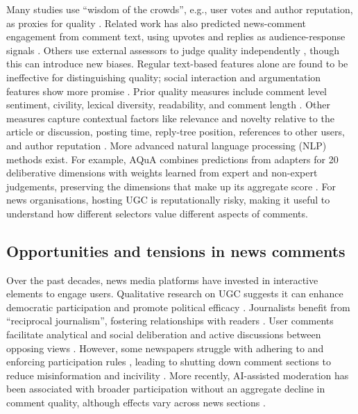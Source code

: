 Many studies use ``wisdom of the crowds'', e.g., user votes and author reputation, as proxies for quality \citep{Momeni2016, Wei2016, Tan2016}. Related work has also predicted news-comment engagement from comment text, using upvotes and replies as audience-response signals \citep{RischKrestel2020}. Others use external assessors to judge quality independently \citep{Momeni2016}, though this can introduce new biases. Regular text-based features alone are found to be ineffective for distinguishing quality; social interaction and argumentation features show more promise \citep{Momeni2016}. Prior quality measures include comment level sentiment, civility, lexical diversity, readability, and comment length \citep{Diakopoulos2015,Otterbacher2009,Park2016,Wang2021}. Other measures capture contextual factors like relevance and novelty relative to the article or discussion, posting time, reply-tree position, references to other users, and author reputation \citep{Otterbacher2009,Schuth2007,Momeni2016}.
More advanced natural language processing (NLP) methods exist. For example, AQuA combines predictions from adapters for 20 deliberative dimensions with weights learned from expert and non-expert judgements, preserving the dimensions that make up its aggregate score \citep{Behrendt2024}. For news organisations, hosting UGC is reputationally risky, making it useful to understand how different selectors value different aspects of comments.

\subsection{Opportunities and tensions in news comments}
Over the past decades, news media platforms have invested in interactive elements to engage users. Qualitative research on UGC suggests it can enhance democratic participation and promote political efficacy \citep{ManosevitchTenenboim2017}. Journalists benefit from ``reciprocal journalism'', fostering relationships with readers \citep{Chen2017}. User comments facilitate analytical and social deliberation and active discussions between opposing views \citep{ManosevitchWalker2009, Kelly2005}. However, some newspapers struggle with adhering to and enforcing participation rules \citep{Noci2012}, leading to shutting down comment sections to reduce misinformation and incivility \citep{Nelson2021}. More recently, AI-assisted moderation has been associated with broader participation without an aggregate decline in comment quality, although effects vary across news sections \citep{Rajadesingan2026}.


